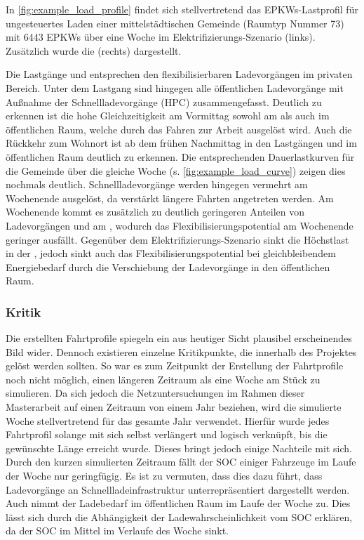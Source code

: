 

In \autoref{fig:example_load_profile} findet sich stellvertretend das \glspl{EPKW}-Lastprofil für ungesteuertes Laden einer mittelstädtischen Gemeinde (Raumtyp Nummer \num{73}) mit \num{6443} \glspl{EPKW} über eine Woche im Elektrifizierungs-Szenario (links).
Zusätzlich wurde die \SzeFirmenparkplatz (rechts) dargestellt.



Die Lastgänge \zH und \Firmeparkplatz entsprechen den flexibilisierbaren Ladevorgängen im privaten Bereich. Unter dem Lastgang \oeffen sind hingegen alle öffentlichen Ladevorgänge mit Außnahme der Schnellladevorgänge (\gls{HPC}) zusammengefasst. Deutlich zu erkennen ist die hohe Gleichzeitigkeit am Vormittag sowohl am \Firmeparkplatz als auch im öffentlichen Raum, welche durch das Fahren zur Arbeit ausgelöst wird.
Auch die Rückkehr zum Wohnort ist ab dem frühen Nachmittag in den Lastgängen \zH und im öffentlichen Raum deutlich zu erkennen. Die entsprechenden Dauerlastkurven für die Gemeinde über die gleiche Woche (s. \autoref{fig:example_load_curve}) zeigen dies nochmals deutlich.
Schnellladevorgänge werden hingegen vermehrt am Wochenende ausgelöst, da verstärkt längere Fahrten angetreten werden.
Am Wochenende kommt es zusätzlich zu deutlich geringeren Anteilen von Ladevorgängen \zH und am \Firmeparkplatzdot, wodurch das Flexibilisierungspotential am Wochenende geringer ausfällt.
Gegenüber dem Elektrifizierungs-Szenario sinkt die Höchstlast in der \SzeFirmenparkplatzdot, jedoch sinkt auch das Flexibilisierungspotential bei gleichbleibendem Energiebedarf durch die Verschiebung der Ladevorgänge in den öffentlichen Raum.




\subsubsection{Kritik}

Die erstellten Fahrtprofile spiegeln ein aus heutiger Sicht plausibel erscheinendes Bild wider.
Dennoch existieren einzelne Kritikpunkte, die innerhalb des \simbev Projektes gelöst werden sollten.
So war es zum Zeitpunkt der Erstellung der Fahrtprofile noch nicht möglich, einen längeren Zeitraum als eine Woche am Stück zu simulieren.
Da sich jedoch die Netzuntersuchungen im Rahmen dieser Masterarbeit auf einen Zeitraum von einem Jahr beziehen, wird die simulierte Woche stellvertretend für das gesamte Jahr verwendet.
Hierfür wurde jedes Fahrtprofil solange mit sich selbst verlängert und logisch verknüpft, bis die gewünschte Länge erreicht wurde.
Dieses bringt jedoch einige Nachteile mit sich.
Durch den kurzen simulierten Zeitraum fällt der \gls{SOC} einiger Fahrzeuge im Laufe der Woche nur geringfügig.
Es ist zu vermuten, dass dies dazu führt, dass Ladevorgänge an Schnellladeinfrastruktur un­ter­re­prä­sen­tiert dargestellt werden.
Auch nimmt der Ladebedarf im öffentlichen Raum im Laufe der Woche zu.
Dies lässt sich durch die Abhängigkeit der Ladewahrscheinlichkeit vom \gls{SOC} erklären, da der \gls{SOC} im Mittel im Verlaufe des Woche sinkt.


